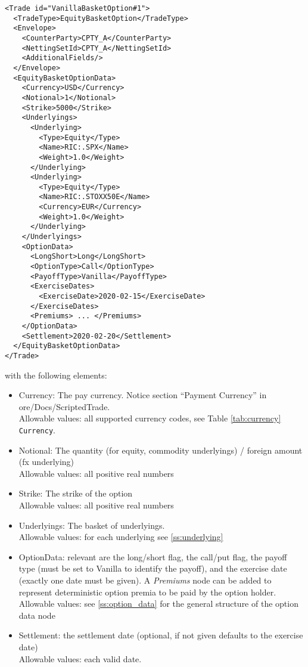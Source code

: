 \begin{verbatim}
<Trade id="VanillaBasketOption#1">
  <TradeType>EquityBasketOption</TradeType>
  <Envelope>
    <CounterParty>CPTY_A</CounterParty>
    <NettingSetId>CPTY_A</NettingSetId>
    <AdditionalFields/>
  </Envelope>
  <EquityBasketOptionData>
    <Currency>USD</Currency>
    <Notional>1</Notional>
    <Strike>5000</Strike>
    <Underlyings>
      <Underlying>
        <Type>Equity</Type>
        <Name>RIC:.SPX</Name>
        <Weight>1.0</Weight>
      </Underlying>
      <Underlying>
        <Type>Equity</Type>
        <Name>RIC:.STOXX50E</Name>
        <Currency>EUR</Currency>
        <Weight>1.0</Weight>
      </Underlying>
    </Underlyings>
    <OptionData>
      <LongShort>Long</LongShort>
      <OptionType>Call</OptionType>
      <PayoffType>Vanilla</PayoffType>
      <ExerciseDates>
        <ExerciseDate>2020-02-15</ExerciseDate>
      </ExerciseDates>
      <Premiums> ... </Premiums>
    </OptionData>
    <Settlement>2020-02-20</Settlement>
  </EquityBasketOptionData>
</Trade>
\end{verbatim}

with the following elements:

\begin{itemize}
\item Currency: The pay currency. Notice section ``Payment Currency'' in ore/Docs/ScriptedTrade. \\
  Allowable values: all supported currency codes, see Table \ref{tab:currency} \lstinline!Currency!.
\item Notional: The quantity (for equity, commodity underlyings) / foreign amount (fx underlying) \\
  Allowable values: all positive real numbers
\item Strike: The strike of the option \\
  Allowable values: all positive real numbers
\item Underlyings: The basket of underlyings. \\
  Allowable values: for each underlying see \ref{ss:underlying}
\item OptionData: relevant are the long/short flag, the call/put flag, the payoff type (must be set to Vanilla to
  identify the payoff), and the exercise date (exactly one date must be given). A \emph{Premiums} node can be added to represent deterministic option premia to be paid by the option holder. \\
  Allowable values: see \ref{ss:option_data} for the general structure of the option data node
\item Settlement: the settlement date (optional, if not given defaults to the exercise date) \\
  Allowable values: each valid date.
\end{itemize}

